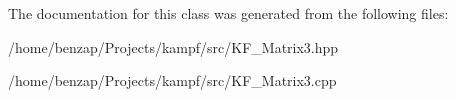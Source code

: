 The documentation for this class was generated from the following files\-:\begin{DoxyCompactItemize}
\item 
/home/benzap/\-Projects/kampf/src/K\-F\-\_\-\-Matrix3.\-hpp\item 
/home/benzap/\-Projects/kampf/src/K\-F\-\_\-\-Matrix3.\-cpp\end{DoxyCompactItemize}

